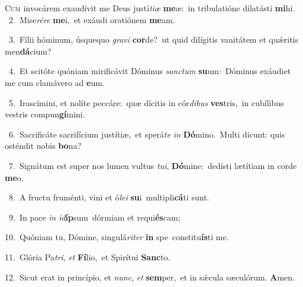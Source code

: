 \lettrine{\initial\textcolor{\initialcolor}{C}}{um} invocárem exaudívit me Deus justí\-\textit{ti}\-\textit{æ} \textbf{me}\-æ:~\star in tribulatióne dilatásti \textbf{mi}\-hi.\\
{\numbfont\textcolor{\numbcolor}{~2.}}~Mise\-\textit{ré}\-\textit{re} \textbf{me}\-i,~\star et exáudi oratiónem \textbf{me}\-am.\par
{\numbfont\textcolor{\numbcolor}{~3.}}~Fílii hóminum, úsquequo \textit{gra}\-\textit{vi} \textbf{cor}\-de?~\star ut quid dilígitis vanitátem et quǽritis men\-\textbf{dá}\-cium?\par
{\numbfont\textcolor{\numbcolor}{~4.}}~Et scitóte quóniam mirificávit Dóminus \textit{sanc}\-\textit{tum} \textbf{su}\-um:~\star Dóminus exáudiet me cum clamávero ad \textbf{e}\-um.\par
{\numbfont\textcolor{\numbcolor}{~5.}}~Irascímini, et nolíte peccáre:~\dagger quæ dícitis in cór\-\textit{di}\-\textit{bus} \textbf{ves}\-tris,~\star in cubílibus vestris compun\-\textbf{gí}\-mini.\par
{\numbfont\textcolor{\numbcolor}{~6.}}~Sacrificáte sacrifícium justítiæ,~\dagger et sperá\textit{te} \textit{in} \textbf{Dó}\-mino.~\star Multi dicunt: quis osténdit nobis \textbf{bo}\-na?\par
{\numbfont\textcolor{\numbcolor}{~7.}}~Signátum est super nos lumen vultus \textit{tu}\-\textit{i}, \textbf{Dó}\-mine:~\star dedísti lætítiam in corde \textbf{me}\-o.\par
{\numbfont\textcolor{\numbcolor}{~8.}}~A fructu fruménti, vini et ó\-\textit{le}\-\textit{i} \textbf{su}\-i~\star multipli\-\textbf{cá}\-ti sunt.\par
{\numbfont\textcolor{\numbcolor}{~9.}}~In pace \textit{in} \textit{id}\-\textbf{íp}sum~\star dórmiam et requi\-\textbf{és}\-cam;\par
{\numbfont\textcolor{\numbcolor}{10.}}~Quóniam tu, Dómine, singulá\-\textit{ri}\-\textit{ter} \textbf{in} spe~\star constitu\-\textbf{ís}\-ti me.\par
{\numbfont\textcolor{\numbcolor}{11.}}~Glória Pa\-\textit{tri}\-, \textit{et} \textbf{Fí}\-lio,~\star et Spirítui \textbf{Sanc}\-to.\par
{\numbfont\textcolor{\numbcolor}{12.}}~Sicut erat in princípio, et \textit{nunc}\-, \textit{et} \textbf{sem}\-per,~\star et in sǽcula sæculórum. \textbf{A}\-men.\par
